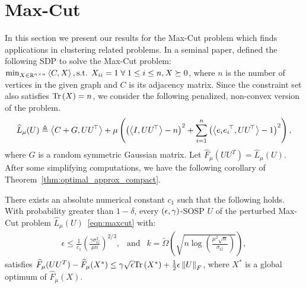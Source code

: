 \section{Max-Cut}\label{sec:maxcut}
In this section we present our results for the Max-Cut problem which finds applications in clustering related problems. In a seminal paper, \cite{goemans1995improved} defined the following SDP to solve the Max-Cut problem: $\min_{X\in \mathbb{R}^{n\times n}} \left\langle C, X \right\rangle, \mbox{s.t. } X_{ii} = 1 \; \forall \; 1 \leq i \leq n, X \succeq 0 $, where $n$ is the number of vertices in the given graph and $C$ is its adjacency matrix. Since the constraint set also satisfies $\mathrm{Tr}\left(X\right)=n$, we consider the following penalized, non-convex version of the problem.
\begin{align}
	\widehat{L}_{\mu}(U) \triangleq \left\langle C+G, U{U}^{\!\top} \right\rangle + \mu\left(\left(\left\langle I, U{U}^{\!\top} \right\rangle-n\right)^2 + \sum_{i=1}^{n}\left(\left\langle e_i {e_i}^{\!\top}, U{U}^{\!\top} \right\rangle-1\right)^2\right),\label{eqn:maxcut}
\end{align}
where $G$ is a random symmetric Gaussian matrix.  Let $\widehat F_{\mu}(UU^T) = \widehat L_{\mu} (U)$. After some simplifying computations, we have the following corollary of Theorem~\ref{thm:optimal_approx_compact}.
\begin{corollary}\label{cor:maxcut}
There exists an absolute numerical constant $c_1$ such that the following holds. With probability greater than $1-\delta$,
every $(\epsilon, \gamma)$-SOSP $U$ of the perturbed Max-Cut problem $\widehat{L}_{\mu}(U)$~\eqref{eqn:maxcut} with:
\begin{align*}\epsilon \leq \frac{1}{c_1} \left(\frac{\gamma \sigma_G^2}{\mu n}\right)^{2/3},~~ \text{ and } ~~  k = \tilde{\Omega} \left( \sqrt{n \log\left(\frac{\mu^2 \sqrt{n}}{\sigma_G}\right)}\right),
\end{align*}
satisfies $	\widehat{F}_{\mu}(UU^T) - \widehat{F}_{\mu}(X^*) \leq \gamma \sqrt{\epsilon} \mathrm{Tr}\left(X^*\right) +\frac{1}{2} \epsilon \left\lVert{U}\right\rVert_F$, where $X^*$ is a global optimum of $\widehat{F}_{\mu}(X)$.
\end{corollary}
